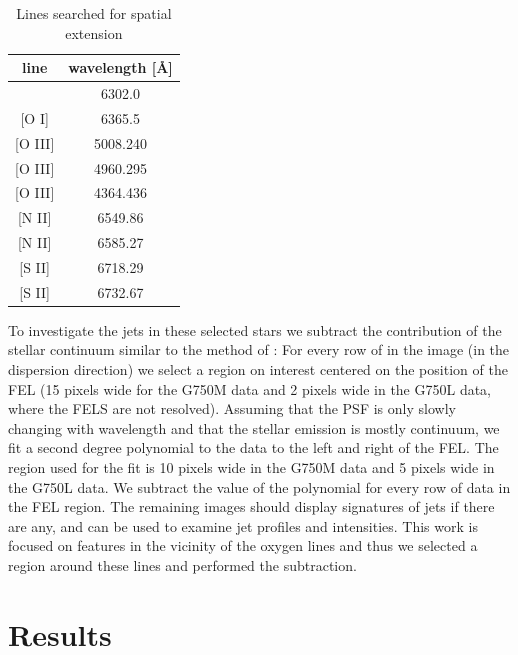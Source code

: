 \documentclass[twocolumn]{aastex62}
\begin{document}

\begin{table}
\caption{{Lines searched for spatial extension\label{tab:searchedlines}}}
\begin{center}
\begin{tabular}{cc}
\hline\hline
line & wavelength [\AA] \\
\hline
[O I] & 6302.0\\{}
[O I] & 6365.5\\{}
[O III] & 5008.240\\{}
[O III] & 4960.295\\{}
[O III] & 4364.436\\{}
[N II] & 6549.86\\{}
[N II] & 6585.27\\{}
[S II] & 6718.29\\{}
[S II] & 6732.67\\
\hline
\end{tabular}
\end{center}
\end{table}


To investigate the jets in these selected stars we subtract the contribution of the stellar continuum similar to the method of \citep{2013A&A...550L...1S}: For every row of in the image (in the dispersion direction) we select a region on interest centered on the position of the FEL (15 pixels wide for the G750M data and 2 pixels wide in the G750L data, where the FELS are not resolved). Assuming that the PSF is only slowly changing with wavelength and that the stellar emission is mostly continuum, we fit a second degree polynomial to the data to the left and right of the FEL. The region used for the fit is 10 pixels wide in the G750M data and 5 pixels wide in the G750L data. We subtract the value of the polynomial for every row of data in the FEL region. The remaining images should display signatures of jets if there are any, and can be used to examine jet profiles and intensities. This work is focused on features in the vicinity of the oxygen lines and thus we selected a
region around these lines and performed the subtraction.

\section{Results}
\label{sect:results}
\end{document}
